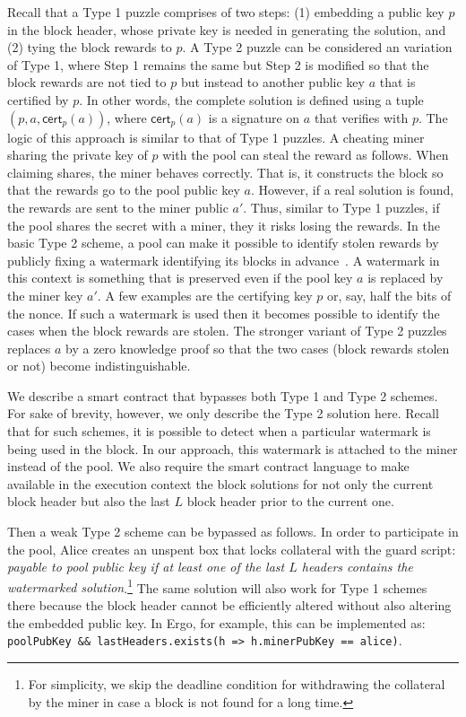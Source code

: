 \documentclass[runningheads]{llncs}
\begin{document}
Recall that a Type 1 puzzle comprises of two steps: (1) embedding a public key $p$ in the block header, whose private key is needed in generating the solution, and (2) tying the block rewards to $p$. 
A Type 2 puzzle can be considered an variation of Type 1, where Step 1 remains the same but Step 2 is modified so that the block rewards are not tied to $p$ but instead to another public key $a$ that is certified by $p$. In other words, the complete solution is defined using a tuple $(p, a, \textsf{cert}_p(a))$, where $\textsf{cert}_p(a)$ is a signature on $a$ that verifies with $p$. The logic of this approach is similar to that of Type 1 puzzles. A cheating miner sharing the private key of $p$ with the pool can steal the reward as follows. When claiming shares, the miner behaves correctly. That is, it constructs the block so that the rewards go to the pool public key $a$. However, if a real solution is found, the rewards are sent to the miner public $a'$. Thus, similar to Type 1 puzzles, if the pool shares the secret with a miner, they it risks losing the rewards. 
In the basic Type 2 scheme, a pool can make it possible to identify stolen rewards by publicly fixing a watermark identifying its blocks in advance~\cite{miller2015nonoutsourceable}. A watermark in this context is something that is preserved even if the pool key $a$ is replaced by the miner key $a'$. A few examples are the certifying key $p$ or, say, half the bits of the nonce. If such a watermark is used then it becomes possible to identify the cases when the block rewards are stolen. 
The stronger variant of Type 2 puzzles replaces $a$ by a zero knowledge proof so that the two cases (block rewards stolen or not) become indistinguishable. 

We describe a smart contract that bypasses both Type 1 and Type 2 schemes. For sake of brevity, however, we only describe the Type 2 solution here. Recall that for such schemes, it is possible to detect when a particular watermark is being used in the block. In our approach, this watermark is attached to the miner instead of the pool. 
We also require the smart contract language to make available in the execution context the block solutions for not only the current block header but also the last $L$ block header prior to the current one. 

Then a weak Type 2 scheme can be bypassed as follows. In order to participate in the pool, Alice creates an unspent box that locks collateral with the guard script: {\em payable to pool public key if at least one of the last $L$ headers contains the watermarked solution}.\footnote{For simplicity, we skip the deadline condition for withdrawing the collateral by the miner in case a block is not found for a long time. 
} The same solution will also work for Type 1 schemes there because the block header cannot be efficiently altered without also altering the embedded public key. In Ergo, for example, this can be implemented as: \texttt{poolPubKey \&\& lastHeaders.exists(h => h.minerPubKey == alice)}.
\end{document}
